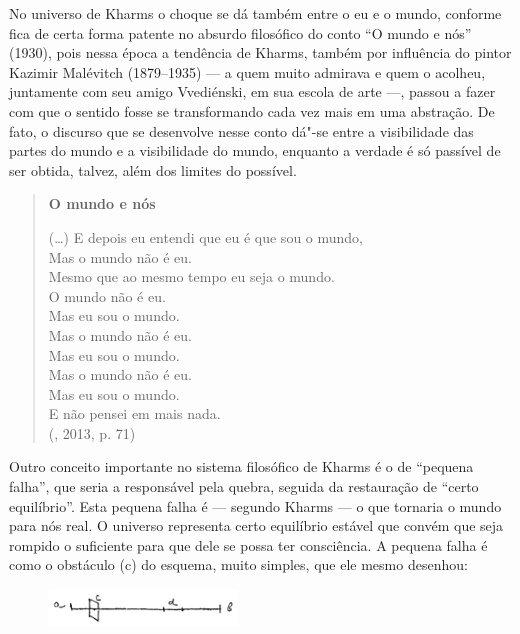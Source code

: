 No universo de Kharms o choque se dá também entre o eu e o mundo,
conforme fica de certa forma patente no absurdo filosófico do conto ``O
mundo e nós'' (1930), pois nessa época a tendência de Kharms, também por
influência do pintor Kazimir Malévitch (1879--1935) --- a quem muito admirava e quem o
acolheu, juntamente com seu amigo Vvediénski, em sua escola de arte ---,
passou a fazer com que o sentido fosse se transformando cada vez mais
em uma abstração. De fato, o discurso que se desenvolve nesse conto
dá"-se entre a visibilidade das partes do mundo e a visibilidade do
mundo, enquanto a verdade é só passível de ser obtida, talvez, além dos
limites do possível.

\begin{verse}
\textbf{O mundo e nós}

(\ldots{})
E depois eu entendi que eu é que sou o mundo,\\
Mas o mundo não é eu.\\ 
Mesmo que ao mesmo tempo eu seja o mundo.\\
O mundo não é eu.\\
Mas eu sou o mundo.\\
Mas o mundo não é eu.\\
Mas eu sou o mundo.\\
Mas o mundo não é eu.\\
Mas eu sou o mundo.\\
E não pensei em mais nada.\\

(, 2013, p. 71)


\end{verse}

Outro conceito importante no sistema filosófico de Kharms é o de
``pequena falha'', que seria a responsável pela quebra, seguida da
restauração de ``certo equilíbrio''. Esta pequena falha é --- segundo
Kharms --- o que tornaria o mundo para nós real. O universo representa
certo equilíbrio estável que convém que seja rompido o suficiente para
que dele se possa ter consciência. A pequena falha é como o obstáculo
(c) do esquema, muito simples, que ele mesmo desenhou:

\begin{figure}[!ht]
\centering
  \includegraphics[width=50mm]{./imgs/grafico4.jpg}
\end{figure}

